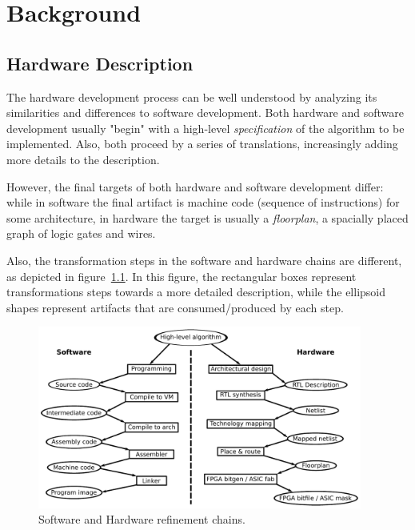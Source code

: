 \chapter{Background}
\label{chap:hardware}

    \section{Hardware Description}
    \label{sec:hardware-description}

        The hardware development process can be well understood by analyzing its
        similarities and differences to software development.
        Both hardware and software development usually "begin" with a high-level \emph{specification}
        of the algorithm to be implemented.
        Also, both proceed by a series of translations, increasingly adding more details to the description.

        However, the final targets of both hardware and software development differ:
        while in software the final artifact is machine code (sequence of instructions) for some architecture,
        in hardware the target is usually a \emph{floorplan}, a spacially placed graph of logic gates and wires.

        Also, the transformation steps in the software and hardware chains are different,
        as depicted in figure~\ref{fig:sw-hw-chains}.
        In this figure, the rectangular boxes represent transformations steps towards a more detailed description,
        while the ellipsoid shapes represent artifacts that are consumed/produced by each step.

        \begin{figure}[h]
            \centerline{\includegraphics[width=0.95\textwidth]{imgs/sw-hw-chains.pdf}}
            \caption{Software and Hardware refinement chains. \label{fig:sw-hw-chains}}
        \end{figure}

